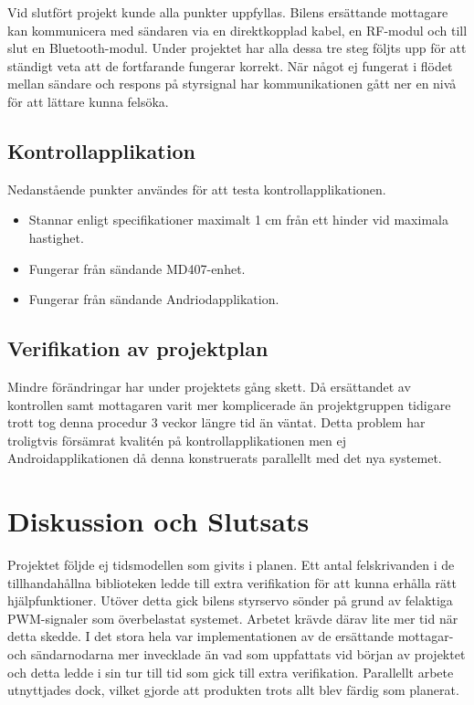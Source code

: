 \documentclass[a4paper]{article}
\begin{document}
\noindent
Vid slutfört projekt kunde alla punkter uppfyllas. Bilens ersättande mottagare kan kommunicera med sändaren via en direktkopplad kabel, en RF-modul och till slut en Bluetooth-modul. Under projektet har alla dessa tre steg följts upp för att ständigt veta att de fortfarande fungerar korrekt. När något ej fungerat i flödet mellan sändare och respons på styrsignal har kommunikationen gått ner en nivå för att lättare kunna felsöka.

\subsection{Kontrollapplikation}
Nedanstående punkter användes för att testa kontrollapplikationen.

\begin{itemize}
\item Stannar enligt specifikationer maximalt 1 cm från ett hinder vid maximala hastighet.
\item Fungerar från sändande MD407-enhet.
\item Fungerar från sändande Andriodapplikation.
\end{itemize}



\subsection{Verifikation av projektplan}
Mindre förändringar har under projektets gång skett. Då ersättandet av kontrollen samt mottagaren varit mer komplicerade än projektgruppen tidigare trott tog denna procedur 3 veckor längre tid än väntat. Detta problem har troligtvis försämrat kvalitén på kontrollapplikationen men ej Androidapplikationen då denna konstruerats parallellt med det nya systemet.



\newpage
\section{Diskussion och Slutsats}

Projektet följde ej tidsmodellen som givits i planen. Ett antal felskrivanden i de tillhandahållna biblioteken ledde till extra verifikation för att kunna erhålla rätt hjälpfunktioner. Utöver detta gick bilens styrservo sönder på grund av felaktiga PWM-signaler som överbelastat systemet. Arbetet krävde därav lite mer tid när detta skedde. I det stora hela var implementationen av de ersättande mottagar- och sändarnodarna mer invecklade än vad som uppfattats vid början av projektet och detta ledde i sin tur till tid som gick till extra verifikation. Parallellt arbete utnyttjades dock, vilket gjorde att produkten trots allt blev färdig som planerat.
\end{document}
